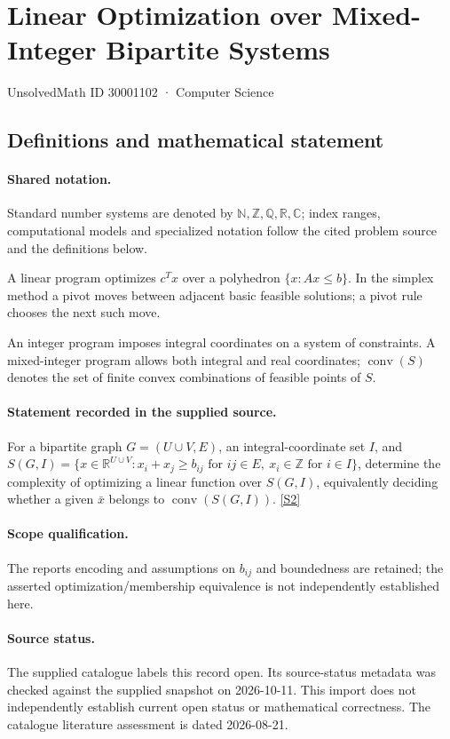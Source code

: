 \documentclass[11pt]{article}
\newcommand{\sref}[2]{\hyperlink{source:#1:#2}{[S#2]}}
\begin{document}
\setcounter{section}{30001101}
\section{Linear Optimization over Mixed-Integer Bipartite Systems}\label{30001102}
{\small\sffamily UnsolvedMath ID 30001102 · Computer Science}
\subsection{Definitions and mathematical statement}

\paragraph{Shared notation.}Standard number systems are denoted by $\mathbb N,\mathbb Z,\mathbb Q,\mathbb R,\mathbb C$; index ranges, computational models and specialized notation follow the cited problem source and the definitions below.


A linear program optimizes $c^Tx$ over a polyhedron $\{x:Ax\leq b\}$. In the simplex method a pivot moves between adjacent basic feasible solutions; a pivot rule chooses the next such move.

An integer program imposes integral coordinates on a system of constraints. A mixed-integer program allows both integral and real coordinates; $\operatorname{conv}(S)$ denotes the set of finite convex combinations of feasible points of $S$.
\paragraph{Statement recorded in the supplied source.}
For a bipartite graph $G=(U\cup V,E)$, an integral-coordinate set $I$, and $S(G,I)=\{x\in\mathbb{R}^{U\cup V}:x_i+x_j\geq b_{ij}\text{ for }ij\in E,\ x_i\in\mathbb{Z}\text{ for }i\in I\}$, determine the complexity of optimizing a linear function over $S(G,I)$, equivalently deciding whether a given $\bar{x}$ belongs to $\operatorname{conv}(S(G,I))$. \sref{30001102}{2}
\paragraph{Scope qualification.}
The report\textquotesingle s encoding and assumptions on $b_{ij}$ and boundedness are retained; the asserted optimization/membership equivalence is not independently established here.
\paragraph{Source status.}
The supplied catalogue labels this record open. Its source-status metadata was checked against the supplied snapshot on 2026-10-11. This import does not independently establish current open status or mathematical correctness. The catalogue literature assessment is dated 2026-08-21.
\end{document}
